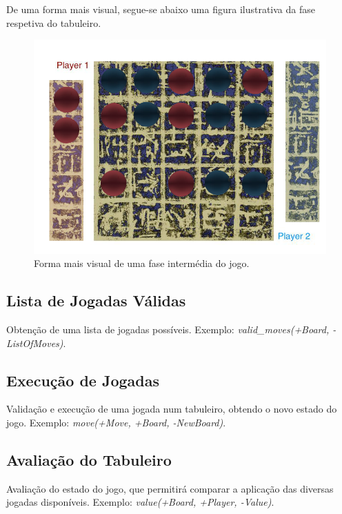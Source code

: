 \documentclass[a4paper]{article}
\begin{document}
De uma forma mais visual, segue-se abaixo uma figura ilustrativa da fase respetiva do tabuleiro.

\begin{figure}[!htb]
	\centering
	\includegraphics[scale=0.6]{images/board_inter.png}
	\caption{Forma mais visual de uma fase intermédia do jogo.}
\end{figure}

\newpage


\subsection{Lista de Jogadas Válidas} Obtenção de uma lista de jogadas possíveis. Exemplo: \textit{valid\_moves(+Board, -ListOfMoves)}.

\subsection{Execução de Jogadas} Validação e execução de uma jogada num tabuleiro, obtendo o novo estado do jogo. Exemplo: \textit{move(+Move, +Board, -NewBoard)}.

\subsection{Avaliação do Tabuleiro} Avaliação do estado do jogo, que permitirá comparar a aplicação das diversas jogadas disponíveis. Exemplo: \textit{value(+Board, +Player, -Value)}.
\end{document}
